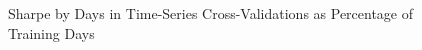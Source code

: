 \documentclass{article}
\begin{document}
\begin{figure}[h]
    \centering
    \caption{Sharpe by Days in Time-Series Cross-Validations as Percentage of Training Days}
    \label{fig:time_series_time_series_tscv_size_multiple}
\end{figure}
\end{document}
